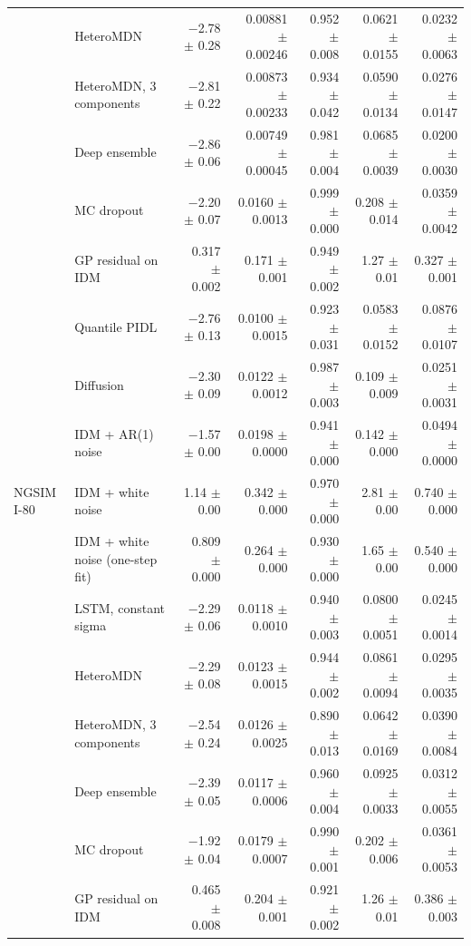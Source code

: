 \begin{longtable}{llrrrrr}
 & HeteroMDN & $-$2.78 $\pm$ 0.28 & 0.00881 $\pm$ 0.00246 & 0.952 $\pm$ 0.008 & 0.0621 $\pm$ 0.0155 & 0.0232 $\pm$ 0.0063 \\
 & HeteroMDN, 3 components & $-$2.81 $\pm$ 0.22 & 0.00873 $\pm$ 0.00233 & 0.934 $\pm$ 0.042 & 0.0590 $\pm$ 0.0134 & 0.0276 $\pm$ 0.0147 \\
 & Deep ensemble & $-$2.86 $\pm$ 0.06 & 0.00749 $\pm$ 0.00045 & 0.981 $\pm$ 0.004 & 0.0685 $\pm$ 0.0039 & 0.0200 $\pm$ 0.0030 \\
 & MC dropout & $-$2.20 $\pm$ 0.07 & 0.0160 $\pm$ 0.0013 & 0.999 $\pm$ 0.000 & 0.208 $\pm$ 0.014 & 0.0359 $\pm$ 0.0042 \\
 & GP residual on IDM & 0.317 $\pm$ 0.002 & 0.171 $\pm$ 0.001 & 0.949 $\pm$ 0.002 & 1.27 $\pm$ 0.01 & 0.327 $\pm$ 0.001 \\
 & Quantile PIDL & $-$2.76 $\pm$ 0.13 & 0.0100 $\pm$ 0.0015 & 0.923 $\pm$ 0.031 & 0.0583 $\pm$ 0.0152 & 0.0876 $\pm$ 0.0107 \\
 & Diffusion & $-$2.30 $\pm$ 0.09 & 0.0122 $\pm$ 0.0012 & 0.987 $\pm$ 0.003 & 0.109 $\pm$ 0.009 & 0.0251 $\pm$ 0.0031 \\
 & IDM + AR(1) noise & $-$1.57 $\pm$ 0.00 & 0.0198 $\pm$ 0.0000 & 0.941 $\pm$ 0.000 & 0.142 $\pm$ 0.000 & 0.0494 $\pm$ 0.0000 \\
\midrule
NGSIM I-80 & IDM + white noise & 1.14 $\pm$ 0.00 & 0.342 $\pm$ 0.000 & 0.970 $\pm$ 0.000 & 2.81 $\pm$ 0.00 & 0.740 $\pm$ 0.000 \\
 & IDM + white noise (one-step fit) & 0.809 $\pm$ 0.000 & 0.264 $\pm$ 0.000 & 0.930 $\pm$ 0.000 & 1.65 $\pm$ 0.00 & 0.540 $\pm$ 0.000 \\
 & LSTM, constant sigma & $-$2.29 $\pm$ 0.06 & 0.0118 $\pm$ 0.0010 & 0.940 $\pm$ 0.003 & 0.0800 $\pm$ 0.0051 & 0.0245 $\pm$ 0.0014 \\
 & HeteroMDN & $-$2.29 $\pm$ 0.08 & 0.0123 $\pm$ 0.0015 & 0.944 $\pm$ 0.002 & 0.0861 $\pm$ 0.0094 & 0.0295 $\pm$ 0.0035 \\
 & HeteroMDN, 3 components & $-$2.54 $\pm$ 0.24 & 0.0126 $\pm$ 0.0025 & 0.890 $\pm$ 0.013 & 0.0642 $\pm$ 0.0169 & 0.0390 $\pm$ 0.0084 \\
 & Deep ensemble & $-$2.39 $\pm$ 0.05 & 0.0117 $\pm$ 0.0006 & 0.960 $\pm$ 0.004 & 0.0925 $\pm$ 0.0033 & 0.0312 $\pm$ 0.0055 \\
 & MC dropout & $-$1.92 $\pm$ 0.04 & 0.0179 $\pm$ 0.0007 & 0.990 $\pm$ 0.001 & 0.202 $\pm$ 0.006 & 0.0361 $\pm$ 0.0053 \\
 & GP residual on IDM & 0.465 $\pm$ 0.008 & 0.204 $\pm$ 0.001 & 0.921 $\pm$ 0.002 & 1.26 $\pm$ 0.01 & 0.386 $\pm$ 0.003 \\

\end{longtable}
